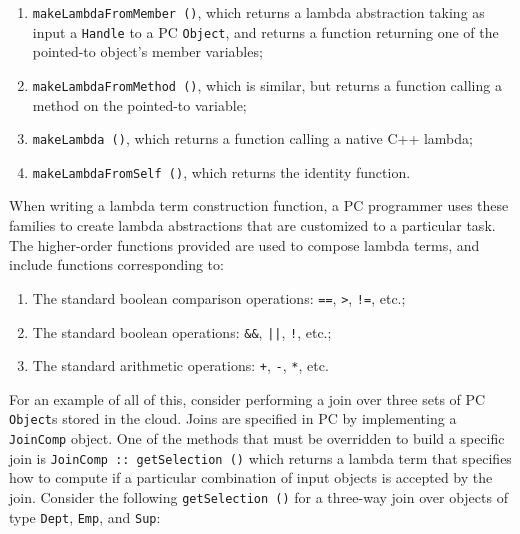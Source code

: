 \begin{enumerate}

\vspace{-5pt}
\item \texttt{makeLambdaFromMember ()}, which returns 
a lambda abstraction taking as input a \texttt{Handle} to a PC \texttt{Object}, and returns a function returning one of the pointed-to object's member variables;

\vspace{-5pt}
\item 
\texttt{makeLambdaFromMethod ()}, which is similar, but returns a function calling a method on the pointed-to variable;

\vspace{-5pt}
\item \texttt{makeLambda ()}, which returns a function calling
a native C++ lambda;

\vspace{-5pt}
\item \texttt{makeLambdaFromSelf ()}, which returns the identity function.

\end{enumerate}

\vspace{-5pt}
\noindent
When writing a lambda term construction function, a PC programmer uses these families to create lambda abstractions that
are customized to a particular task.
The higher-order functions provided are used to compose lambda terms, and
include functions corresponding to:

\begin{enumerate}
\vspace{-5pt}
\item
The standard boolean comparison operations: \texttt{==}, \texttt{>}, \texttt{!=}, etc.;

\vspace{-5pt}
\item
The standard boolean
operations: \texttt{\&\&}, \texttt{||}, \texttt{!}, etc.;

\vspace{-5pt}
\item
The standard arithmetic operations: \texttt{+}, \texttt{-}, \texttt{*}, etc.  
\end{enumerate}

For an example of all of this, consider performing a join over three sets of PC \texttt{Object}s stored in the cloud.  
Joins are specified in PC 
by implementing a \texttt{JoinComp} object. One of the methods that must be overridden to build a specific join is \texttt{JoinComp :: getSelection ()}
which returns a lambda term
that specifies how to compute if a particular combination of input objects is accepted by the join.  Consider the following
\texttt{getSelection ()} for a three-way join over objects of type \texttt{Dept}, \texttt{Emp}, and \texttt{Sup}:



